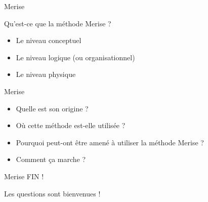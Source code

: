 \documentclass[bigger]{beamer}
\begin{document}
{
%
\begin{frame}{}
\end{frame}
}


\begin{frame}{Merise}

Qu'est-ce que la méthode Merise ?

\begin{itemize}
\item<2-4> Le niveau conceptuel
\item<3,4> Le niveau logique (ou organisationnel)
\item<4> Le niveau physique
\end{itemize}
\end{frame}



\begin{frame}{Merise}

\begin{itemize}
\item<1> Quelle est son origine ?
\item<2> Où cette méthode est-elle utilisée ?
\item<3> Pourquoi peut-ont être amené à utiliser la méthode Merise ?
\item<4> Comment ça marche ?

\end{itemize}
\end{frame}

\begin{frame}{Merise}
FIN ! 

Les questions sont bienvenues !
\end{frame}
\end{document}

